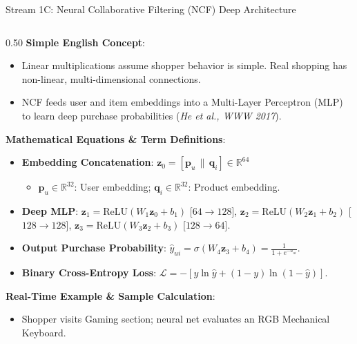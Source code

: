 \documentclass[10pt]{beamer}
\begin{document}
\begin{frame}[fragile]{Stream 1C: Neural Collaborative Filtering (NCF) Deep Architecture}
\begin{columns}[T]
    \begin{column}{0.50\textwidth}
        {\color{brandred}\textbf{Simple English Concept}}:
        \begin{itemize}\scriptsize
            \item Linear multiplications assume shopper behavior is simple. Real shopping has non-linear, multi-dimensional connections.
            \item NCF feeds user and item embeddings into a Multi-Layer Perceptron (MLP) to learn deep purchase probabilities (\textit{He et al., WWW 2017}).
        \end{itemize}
        {\color{brandorange}\textbf{Mathematical Equations \& Term Definitions}}:
        \begin{itemize}\scriptsize
            \item \textbf{Embedding Concatenation}: $\mathbf{z}_0 = [\mathbf{p}_u \,\|\, \mathbf{q}_i] \in \mathbb{R}^{64}$
            \begin{itemize}\tiny
                \item $\mathbf{p}_u \in \mathbb{R}^{32}$: User embedding; $\mathbf{q}_i \in \mathbb{R}^{32}$: Product embedding.
            \end{itemize}
            \item \textbf{Deep MLP}: $\mathbf{z}_1 = \text{ReLU}(W_1 \mathbf{z}_0 + b_1)$ [$64 \to 128$], $\mathbf{z}_2 = \text{ReLU}(W_2 \mathbf{z}_1 + b_2)$ [$128 \to 128$], $\mathbf{z}_3 = \text{ReLU}(W_3 \mathbf{z}_2 + b_3)$ [$128 \to 64$].
            \item \textbf{Output Purchase Probability}: $\hat{y}_{ui} = \sigma(W_4 \mathbf{z}_3 + b_4) = \frac{1}{1 + e^{-a_{ui}}}$.
            \item \textbf{Binary Cross-Entropy Loss}: $\mathcal{L} = - [y \ln \hat{y} + (1 - y)\ln(1 - \hat{y})]$.
        \end{itemize}
        {\color{brandred}\textbf{Real-Time Example \& Sample Calculation}}:
        \begin{itemize}\scriptsize
            \item Shopper visits Gaming section; neural net evaluates an RGB Mechanical Keyboard.

\end{itemize}
\end{column}
\end{columns}
\end{frame}
\end{document}
